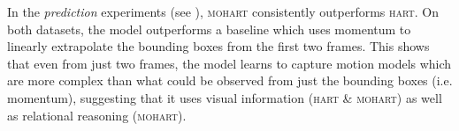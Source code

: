 In the \textit{prediction} experiments (see ), \textsc{mohart} consistently outperforms \textsc{hart}. On both datasets, the model outperforms a baseline which uses momentum to linearly extrapolate the bounding boxes from the first two frames. This shows that even from just two frames, the model learns to capture motion models which are more complex than what could be observed from just the bounding boxes (i.e. momentum), suggesting that it uses visual information (\textsc{hart} \& \textsc{mohart}) as well as relational reasoning (\textsc{mohart}).
